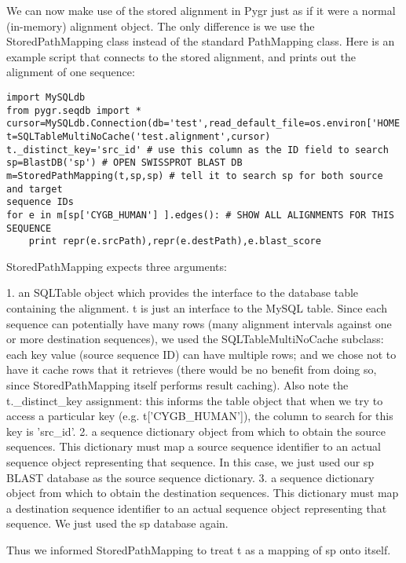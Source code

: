 \documentclass{howto}
\begin{document}
We can now make use of the stored alignment in Pygr just as if it were a normal (in-memory) alignment object.  The only difference is we use the StoredPathMapping class instead of the standard PathMapping class.  Here is an example script that connects to the stored alignment, and prints out the alignment of one sequence:

\begin{verbatim}
import MySQLdb
from pygr.seqdb import *
cursor=MySQLdb.Connection(db='test',read_default_file=os.environ['HOME']+'/.my.cnf').cursor()
t=SQLTableMultiNoCache('test.alignment',cursor)
t._distinct_key='src_id' # use this column as the ID field to search
sp=BlastDB('sp') # OPEN SWISSPROT BLAST DB
m=StoredPathMapping(t,sp,sp) # tell it to search sp for both source and target 
sequence IDs
for e in m[sp['CYGB_HUMAN'] ].edges(): # SHOW ALL ALIGNMENTS FOR THIS SEQUENCE
    print repr(e.srcPath),repr(e.destPath),e.blast_score
\end{verbatim}

StoredPathMapping expects three arguments:

   1. an SQLTable object which provides the interface to the database table containing the alignment.  t is just an interface to the MySQL table.  Since each sequence can potentially have many rows (many alignment intervals against one or more destination sequences), we used the SQLTableMultiNoCache subclass: each key value (source sequence ID) can have multiple rows; and we chose not to have it cache rows that it retrieves (there would be no benefit from doing so, since StoredPathMapping itself performs result caching).  Also note the t._distinct_key assignment: this informs the table object that when we try to access a particular key (e.g. t['CYGB_HUMAN']), the column to search for this key is 'src_id'.
   2. a sequence dictionary object from which to obtain the source sequences.  This dictionary must map a source sequence identifier to an actual sequence object representing that sequence.  In this case, we just used our sp BLAST database as the source sequence dictionary.
   3. a sequence dictionary object from which to obtain the destination sequences.  This dictionary must map a destination sequence identifier to an actual sequence object representing that sequence.  We just used the sp database again.

Thus we informed StoredPathMapping to treat t as a mapping of sp onto itself.
\end{document}
